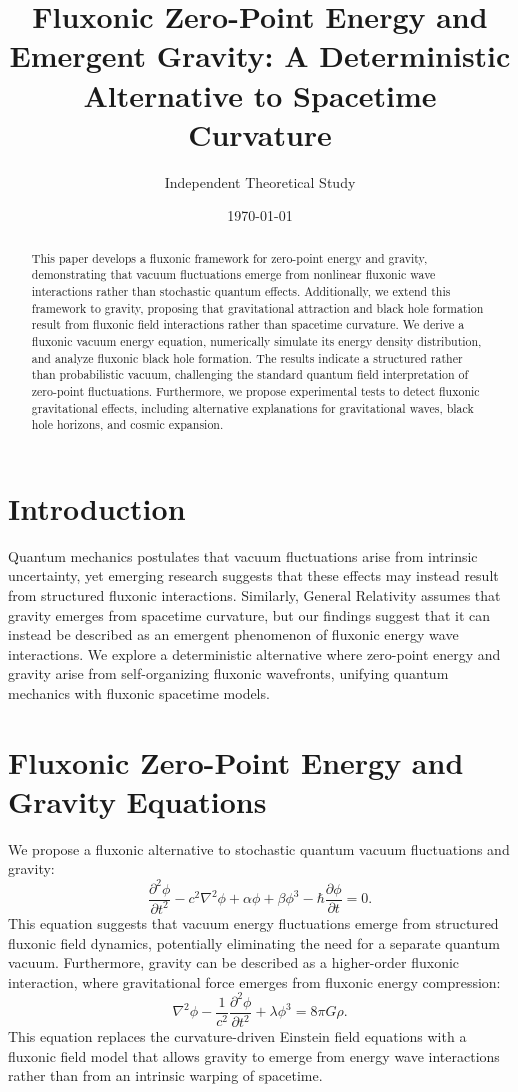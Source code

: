 \documentclass{article}
\title{Fluxonic Zero-Point Energy and Emergent Gravity: A Deterministic Alternative to Spacetime Curvature}
\author{Independent Theoretical Study}
\date{\today}
\begin{document}
\maketitle

\begin{abstract}
This paper develops a fluxonic framework for zero-point energy and gravity, demonstrating that vacuum fluctuations emerge from nonlinear fluxonic wave interactions rather than stochastic quantum effects. Additionally, we extend this framework to gravity, proposing that gravitational attraction and black hole formation result from fluxonic field interactions rather than spacetime curvature. We derive a fluxonic vacuum energy equation, numerically simulate its energy density distribution, and analyze fluxonic black hole formation. The results indicate a structured rather than probabilistic vacuum, challenging the standard quantum field interpretation of zero-point fluctuations. Furthermore, we propose experimental tests to detect fluxonic gravitational effects, including alternative explanations for gravitational waves, black hole horizons, and cosmic expansion.
\end{abstract}

\section{Introduction}
Quantum mechanics postulates that vacuum fluctuations arise from intrinsic uncertainty, yet emerging research suggests that these effects may instead result from structured fluxonic interactions. Similarly, General Relativity assumes that gravity emerges from spacetime curvature, but our findings suggest that it can instead be described as an emergent phenomenon of fluxonic energy wave interactions. We explore a deterministic alternative where zero-point energy and gravity arise from self-organizing fluxonic wavefronts, unifying quantum mechanics with fluxonic spacetime models.

\section{Fluxonic Zero-Point Energy and Gravity Equations}
We propose a fluxonic alternative to stochastic quantum vacuum fluctuations and gravity:
\begin{equation}
    \frac{\partial^2 \phi}{\partial t^2} - c^2 \nabla^2 \phi + \alpha \phi + \beta \phi^3 - \hbar \frac{\partial \phi}{\partial t} = 0.
\end{equation}
This equation suggests that vacuum energy fluctuations emerge from structured fluxonic field dynamics, potentially eliminating the need for a separate quantum vacuum. Furthermore, gravity can be described as a higher-order fluxonic interaction, where gravitational force emerges from fluxonic energy compression:
\begin{equation}
    \nabla^2 \phi - \frac{1}{c^2} \frac{\partial^2 \phi}{\partial t^2} + \lambda \phi^3 = 8 \pi G \rho.
\end{equation}
This equation replaces the curvature-driven Einstein field equations with a fluxonic field model that allows gravity to emerge from energy wave interactions rather than from an intrinsic warping of spacetime.
\end{document}
